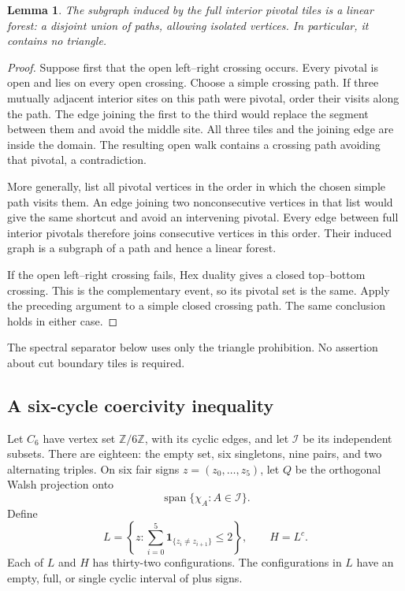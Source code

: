 \documentclass[11pt]{amsart}
\newtheorem{lemma}[theorem]{Lemma}
\theoremstyle{remark}
\newcommand{\one}{\mathbf 1}
\newcommand{\cI}{\mathcal I}
\begin{document}
\begin{lemma}\label{lem:forest}
The subgraph induced by the full interior pivotal tiles is a linear forest: a disjoint union of paths, allowing isolated vertices. In particular, it contains no triangle.
\end{lemma}
\begin{proof}
Suppose first that the open left--right crossing occurs. Every pivotal is open and lies on every open crossing. Choose a simple crossing path. If three mutually adjacent interior sites on this path were pivotal, order their visits along the path. The edge joining the first to the third would replace the segment between them and avoid the middle site. All three tiles and the joining edge are inside the domain. The resulting open walk contains a crossing path avoiding that pivotal, a contradiction.

More generally, list all pivotal vertices in the order in which the chosen simple path visits them. An edge joining two nonconsecutive vertices in that list would give the same shortcut and avoid an intervening pivotal. Every edge between full interior pivotals therefore joins consecutive vertices in this order. Their induced graph is a subgraph of a path and hence a linear forest.

If the open left--right crossing fails, Hex duality gives a closed top--bottom crossing. This is the complementary event, so its pivotal set is the same. Apply the preceding argument to a simple closed crossing path. The same conclusion holds in either case.
\end{proof}

The spectral separator below uses only the triangle prohibition. No assertion about cut boundary tiles is required.

\subsection{A six-cycle coercivity inequality}\label{sec:coercivity}

Let $C_6$ have vertex set $\mathbb Z/6\mathbb Z$, with its cyclic edges, and let $\cI$ be its independent subsets. There are eighteen: the empty set, six singletons, nine pairs, and two alternating triples. On six fair signs $z=(z_0,\ldots,z_5)$, let $Q$ be the orthogonal Walsh projection onto
\[
 \operatorname{span}\{\chi_A:A\in\cI\}.
\]
Define
\[
 L=\left\{z:\sum_{i=0}^5\one_{\{z_i\ne z_{i+1}\}}\le2\right\},
 \qquad H=L^c.
\]
Each of $L$ and $H$ has thirty-two configurations. The configurations in $L$ have an empty, full, or single cyclic interval of plus signs.
\end{document}
